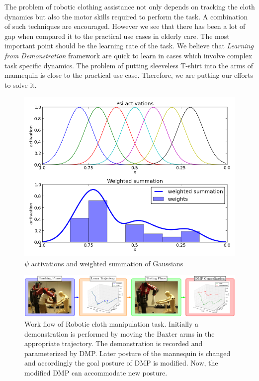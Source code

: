 \documentclass[sigconf]{acmart}
\begin{document}
The problem of robotic clothing assistance not only depends on tracking the cloth dynamics but also the motor skills required to perform the task. A combination of such techniques are encouraged. However we see that there has been a lot of gap when compared it to the practical use cases in elderly care. The most important point should be the learning rate of the task. We believe that \textit{Learning from Demonstration} framework are quick to learn in cases which involve complex task specific dynamics. The problem of putting sleeveless T-shirt into the arms of mannequin is close to the practical use case. Therefore, we are putting our efforts to solve it.

\begin{figure}
	\includegraphics[width=\linewidth]{psi}
	\caption{$\psi$ activations and weighted summation of Gaussians}
	\label{fig:psi_activations}
\end{figure}

\begin{figure}
	\includegraphics[width=\linewidth]{flowchart_conf}
	\caption{Work flow of Robotic cloth manipulation task. Initially a demonstration is performed by moving the Baxter arms in the appropriate trajectory. The demonstration is recorded and parameterized by DMP. Later posture of the mannequin is changed and accordingly the goal posture of DMP is modified. Now, the modified DMP can accommodate new posture.}
	\label{fig:workflow}
\end{figure}
\end{document}
